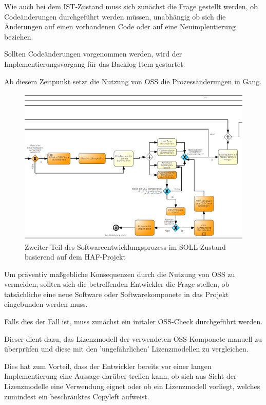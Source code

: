 Wie auch bei dem IST-Zustand muss sich zunächst die Frage gestellt werden, ob Codeänderungen durchgeführt werden müssen, unabhängig ob sich die Änderungen auf einen vorhandenen Code oder auf eine Neuimplentierung beziehen. 

Sollten Codeänderungen vorgenommen werden, wird der Implementierungsvorgang für das Backlog Item gestartet. 

Ab diesem Zeitpunkt setzt die Nutzung von OSS die Prozessänderungen in Gang.

\begin{figure}[h]
    \centering
    \includegraphics[scale=0.5]{Bilder/SOLL-Prozess_second Part.png}
    \caption{Zweiter Teil des Softwareentwicklungsprozess im SOLL-Zustand basierend auf dem HAF-Projekt}
\end{figure}

Um präventiv maßgebliche Konsequenzen durch die Nutzung von OSS zu vermeiden, sollten sich die betreffenden Entwickler die Frage stellen, ob tatsächliche eine neue Software oder Softwarekomponete in das Projekt eingebunden werden muss. 

Falls dies der Fall ist, muss zunächst ein initaler OSS-Check durchgeführt werden. 

Dieser dient dazu, das Lizenzmodell der verwendeten OSS-Komponete manuell zu überprüfen und diese mit den 'ungefährlichen' Lizenzmodellen zu vergleichen. 

Dies hat zum Vorteil, dass der Entwickler bereits vor einer langen Implementierung eine Aussage darüber treffen kann, ob sich aus Sicht der Lizenzmodelle eine Verwendung eignet oder ob ein Lizenzmodell vorliegt, welches zumindest ein beschränktes Copyleft aufweist. 

